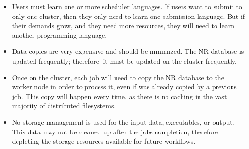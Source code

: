 \begin{itemize}
	\item Users must learn one or more scheduler languages.  If users want to submit to only one cluster, then they only need to learn one submission language.  But if their demands grow, and they need more resources, they will need to learn another programming language.
	\item Data copies are very expensive and should be minimized.  The NR database is updated frequently;  therefore, it must be updated on the cluster frequently.
	\item Once on the cluster, each job will need to copy the NR database to the worker node in order to process it, even if was already copied by a previous job.  This copy will happen every time, as there is no caching in the vast majority of distributed filesystems.
	\item No storage management is used for the input data, executables, or output.  This data may not be cleaned up after the jobs completion, therefore depleting the storage resources available for future workflows.
\end{itemize}







